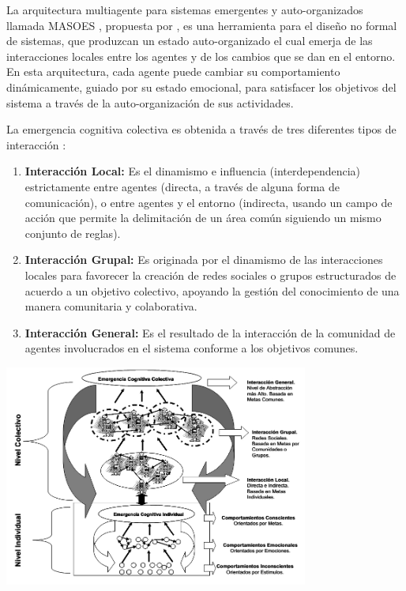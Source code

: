 
La arquitectura multiagente para sistemas emergentes y auto-organizados llamada
MASOES ,
propuesta por \cite{perozo2011}, es una herramienta para el diseño no
formal de sistemas, que produzcan un estado auto-organizado el cual emerja de
las interacciones locales entre los agentes y de los cambios que se dan en el
entorno. En esta arquitectura, cada agente puede cambiar su comportamiento
dinámicamente, guiado por su estado emocional, para satisfacer los
objetivos del sistema a través de la auto-organización de sus actividades.


La emergencia cognitiva colectiva es obtenida a través de tres diferentes
tipos de interacción :

\begin{enumerate}
\item \textbf{Interacción Local:} Es el dinamismo e influencia (interdependencia)
estrictamente entre agentes (directa, a través de alguna forma de comunicación),
o entre agentes y el entorno (indirecta, usando un campo de acción que permite
la delimitación de un área común siguiendo un mismo conjunto de reglas).
\item \textbf{Interacción Grupal:} Es originada por el dinamismo de las interacciones locales
para favorecer la creación de redes sociales o grupos estructurados de acuerdo a
un objetivo colectivo, apoyando la gestión del conocimiento de una manera
comunitaria y colaborativa.
\item \textbf{Interacción General:} Es el resultado de la interacción de la comunidad de
agentes involucrados en el sistema conforme a los objetivos comunes.
\end{enumerate}

\begin{ilustracion}[fuente=\cite{perozo2011}, etiqueta=arquitectura-multiagente-masoes, titulo={Arquitectura de MASOES}]
\includegraphics[width=10cm]{ilustraciones/marco-teorico/arquitectura-multiagente-masoes.jpg}
\end{ilustracion}

